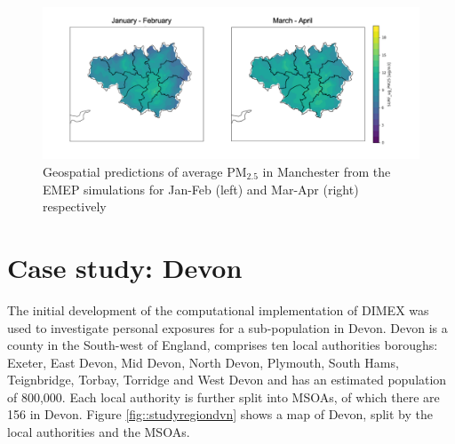 \documentclass{article}
\begin{document}
\begin{figure}
	\centering
	\includegraphics[width=0.95\linewidth]{Figures/EMEP.png}		
	\caption{Geospatial predictions of average PM$_{2.5}$ in Manchester from the EMEP simulations for Jan-Feb (left) and Mar-Apr (right) respectively} \label{fig::emep}
\end{figure}

\clearpage
\section{Case study: Devon}\label{sec::casestudy1}


\noindent The initial development of the computational implementation of DIMEX was used to investigate personal exposures for a sub-population in Devon. Devon is a county in the South-west of England, comprises ten local authorities boroughs: Exeter, East Devon, Mid Devon, North Devon, Plymouth, South Hams, Teignbridge, Torbay, Torridge and West Devon and has an estimated population of 800,000. Each local authority is further split into MSOAs, of which there are 156 in Devon. Figure \ref{fig::studyregiondvn} shows a map of Devon, split by the local authorities  and the MSOAs. \\
\end{document}

